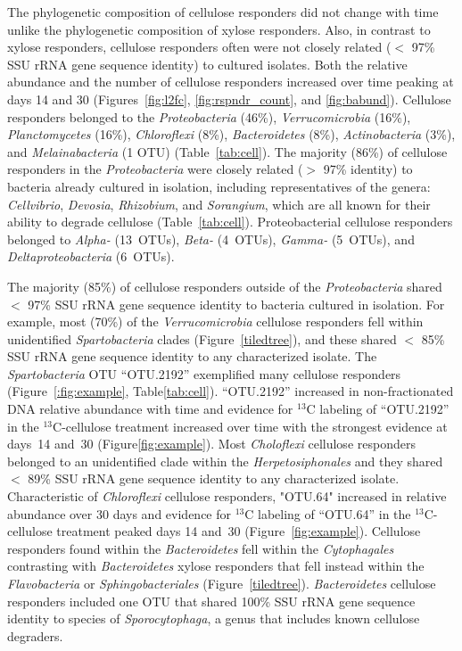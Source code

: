 The phylogenetic composition of cellulose responders did not change with time
unlike the phylogenetic composition of xylose responders. Also, in contrast to
xylose responders, cellulose responders often were not closely related ($<$
97\% SSU rRNA gene sequence identity) to cultured isolates. Both the relative
abundance and the number of cellulose responders increased over time peaking at
days 14 and 30 (Figures~\ref{fig:l2fc}, \ref{fig:rspndr_count}, and
\ref{fig:babund}). Cellulose responders belonged to the \textit{Proteobacteria}
(46\%), \textit{Verrucomicrobia} (16\%), \textit{Planctomycetes} (16\%),
\textit{Chloroflexi} (8\%), \textit{Bacteroidetes} (8\%),
\textit{Actinobacteria} (3\%), and \textit{Melainabacteria} (1 OTU)
(Table~\ref{tab:cell}). The majority (86\%) of cellulose responders in the
\textit{Proteobacteria} were closely related ($>$ 97\% identity) to bacteria
already cultured in isolation, including representatives of the genera:
\textit{Cellvibrio}, \textit{Devosia}, \textit{Rhizobium}, and
\textit{Sorangium}, which are all known for their ability to degrade cellulose
(Table~\ref{tab:cell}). Proteobacterial cellulose responders belonged to
\textit{Alpha-} (13~OTUs), \textit{Beta-} (4~OTUs), \textit{Gamma-} (5~OTUs),
and \textit{Deltaproteobacteria} (6~OTUs). 

The majority (85\%) of cellulose responders outside of the
\textit{Proteobacteria} shared  $<$ 97\% SSU rRNA gene sequence identity to
bacteria cultured in isolation. For example, most (70\%) of the
\textit{Verrucomicrobia} cellulose responders fell within unidentified
\textit{Spartobacteria} clades (Figure~\ref{tiledtree}), and these shared $<$
85\% SSU rRNA gene sequence identity to any characterized isolate. The
\textit{Spartobacteria} OTU ``OTU.2192'' exemplified many cellulose responders
(Figure~\ref{:fig:example}, Table\ref{tab:cell}). ``OTU.2192'' increased in
non-fractionated DNA relative abundance with time and evidence for $^{13}$C
labeling of ``OTU.2192'' in the $^{13}$C-cellulose treatment increased over
time with the strongest evidence at days~14 and~30 (Figure\ref{fig:example}).
Most \textit{Choloflexi} cellulose responders belonged to an unidentified clade
within the \textit{Herpetosiphonales} and they shared $<$ 89\% SSU rRNA gene
sequence identity to any characterized isolate. Characteristic of
\textit{Chloroflexi} cellulose responders, "OTU.64" increased in relative
abundance over 30 days and evidence for $^{13}$C labeling of ``OTU.64'' in the
$^{13}$C-cellulose treatment peaked days 14 and~30 (Figure~\ref{fig:example}).
Cellulose responders found within the \textit{Bacteroidetes} fell within the
\textit{Cytophagales} contrasting with \textit{Bacteroidetes} xylose responders
that fell instead within the \textit{Flavobacteria} or
\textit{Sphingobacteriales} (Figure~\ref{tiledtree}). \textit{Bacteroidetes}
cellulose responders included one OTU that shared 100\% SSU rRNA gene sequence
identity to species of \textit{Sporocytophaga}, a genus that includes known
cellulose degraders.

